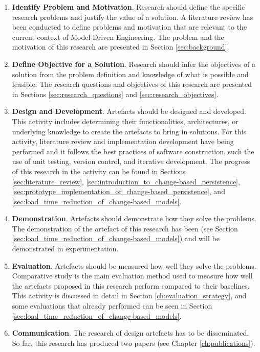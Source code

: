 \documentclass[12pt, a4paper]{report} \usepackage[titletoc]{appendix}
\begin{document}
\begin{enumerate}
	\item \textbf{Identify Problem and Motivation}. Research should define the specific research problems and justify the value of a solution. A literature review has been conducted to define problems and motivation that are relevant to the current context of Model-Driven Engineering. The problem and the motivation of this research are presented in Section \ref{sec:background}.   
	\item \textbf{Define Objective for a Solution}. Research should infer the objectives of a solution from the problem definition and knowledge of what is possible and feasible. The research questions and objectives of this research are presented in Sections \ref{sec:research_questions} and \ref{sec:research_objectives}.
	\item \textbf{Design and Development}. Artefacts should be designed and developed. This activity includes determining their functionalities, architectures, or underlying knowledge to create the artefacts to bring in solutions. For this activity, literature review and implementation development have being performed and it follows the best practices of software construction, such the use of unit testing, version control, and iterative development. The progress of this research in the activity can be found in Sections \ref{sec:literature_review}, \ref{sec:introduction_to_change-based_persistence}, \ref{sec:prototype_implementation_of_change-based_persistence}, and \ref{sec:load_time_reduction_of_change-based_models}. 
	\item \textbf{Demonstration}. Artefacts should demonstrate how they solve the problems. The demonstration of the artefact of this research has been (see Section \ref{sec:load_time_reduction_of_change-based_models}) and will be demonstrated in experimentation. 
	\item \textbf{Evaluation}. Artefacts should be measured how well they solve the problems. Comparative study is the main evaluation method used to measure how well the artefacts proposed in this research perform compared to their baselines. This activity is discussed in detail in Section \ref{ch:evaluation_strategy}, and some evaluations that already performed can be seen in Section \ref{sec:load_time_reduction_of_change-based_models}.
	\item \textbf{Communication}. The research of design artefacts has to be disseminated. So far, this research has produced two papers (see Chapter \ref{ch:publications}). 
\end{enumerate}
\end{document}
